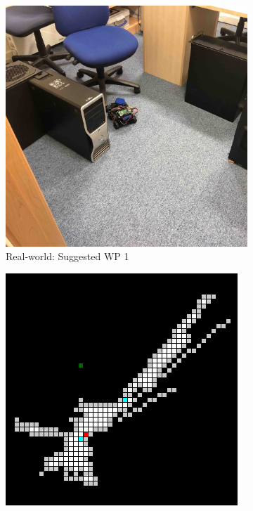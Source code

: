 \begin{figure}[h!]
  \begin{subfigure}[b]{0.32\linewidth}
    \includegraphics[width=\linewidth]{images/real/robo/1.JPG}
     \caption{Real-world: Suggested WP 1}
  \end{subfigure}
  \hfill
  \begin{subfigure}[b]{0.32\linewidth}
    \includegraphics[width=\linewidth]{images/real/sys/1_2.png}

\end{subfigure}
\end{figure}
